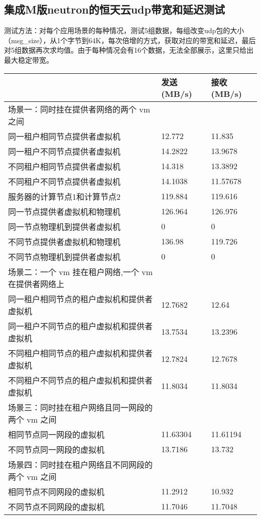 \documentclass[a4paper,left=1.5cm,right=1.5cm,11pt]{article}
\begin{document}
\subsection{集成M版neutron的恒天云udp带宽和延迟测试}
测试方法：对每个应用场景的每种情况，测试5组数据，每组改变udp包的大小（msg\_size），从1个字节到64K，每次倍增的方式，获取对应的带宽和延迟，最后对5组数据再次求均值。由于每种情况会有16个数据，无法全部展示，这里只给出最大稳定带宽。
\begin{center}
\begin{tabular}[c]{|l|l|l|}
\hline
 &发送(MB/s) &接收(MB/s)\\
\hline
 场景一：同时挂在提供者网络的两个 vm 之间 &  & \\
\hline
 同一租户相同节点提供者虚拟机 & 12.772&11.835  \\
\hline
 同一租户不同节点提供者虚拟机 & 14.2822&13.9678  \\
 \hline
 不同租户相同节点提供者虚拟机& 14.318&13.3892  \\
 \hline
 不同租户不同节点提供者虚拟机&14.1038 &11.57678 \\
 \hline
 服务器的计算节点1和计算节点2&119.884 &119.616  \\
 \hline
 同一节点提供者虚拟机和物理机&126.964 &126.976  \\
 \hline
 同一节点物理机到提供者虚拟机&0 &0  \\
 \hline
 不同节点提供者虚拟机和物理机&136.98 &119.726  \\
 \hline
 不同节点物理机到提供者虚拟机&0 &0  \\
 \hline
 \hline
 场景二：一个 vm 挂在租户网络,一个 vm 在提供者网络上& & \\
 \hline
 同一租户相同节点的租户虚拟机和提供者虚拟机&12.7682 &12.64  \\
 \hline
 同一租户不同节点的租户虚拟机和提供者虚拟机&13.7534 &13.2396 \\
 \hline
 不同租户相同节点的租户虚拟机和提供者虚拟机&12.7824 &12.7678  \\
 \hline
 不同租户不同节点的租户虚拟机和提供者虚拟机&11.8034 &11.8034  \\
 \hline
 \hline
 场景三：同时挂在租户网络且同一网段的两个 vm 之间& & \\
 \hline
 相同节点同一网段的虚拟机& 11.63304 &11.61194 \\
 \hline
 不同节点同一网段的虚拟机&  13.7186 &13.732 \\
 \hline
 \hline
 场景四：同时挂在租户网络且不同网段的两个 vm 之间& &\\
 \hline
 相同节点不同网段的虚拟机&11.2912  &10.932 \\
 \hline
 不同节点不同网段的虚拟机&11.7046  &11.7048 \\

\hline
\end{tabular}
\end{center}
\end{document}
